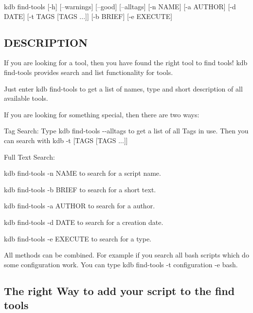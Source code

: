 {\ttfamily kdb find-\/tools} \mbox{[}-\/h\mbox{]} \mbox{[}--warnings\mbox{]} \mbox{[}--good\mbox{]} \mbox{[}--alltags\mbox{]} \mbox{[}-\/n N\+A\+ME\mbox{]} \mbox{[}-\/a A\+U\+T\+H\+OR\mbox{]} \mbox{[}-\/d D\+A\+TE\mbox{]} \mbox{[}-\/t T\+A\+GS \mbox{[}T\+A\+GS ...\mbox{]}\mbox{]} \mbox{[}-\/b B\+R\+I\+EF\mbox{]} \mbox{[}-\/e E\+X\+E\+C\+U\+TE\mbox{]}

\subsection*{D\+E\+S\+C\+R\+I\+P\+T\+I\+ON}

If you are looking for a tool, then you have found the right tool to find tools! {\ttfamily kdb find-\/tools} provides search and list functionality for tools.

Just enter {\ttfamily kdb find-\/tools} to get a list of names, type and short description of all available tools.

If you are looking for something special, then there are two ways\+:


\begin{DoxyEnumerate}
\item Tag Search\+: Type {\ttfamily kdb find-\/tools -\/-\/alltags} to get a list of all Tags in use. Then you can search with {\ttfamily kdb -\/t \mbox{[}T\+A\+GS \mbox{[}T\+A\+GS ...\mbox{]}\mbox{]}}
\item Full Text Search\+:
\begin{DoxyItemize}
\item {\ttfamily kdb find-\/tools -\/n N\+A\+ME} to search for a script name.
\item {\ttfamily kdb find-\/tools -\/b B\+R\+I\+EF} to search for a short text.
\item {\ttfamily kdb find-\/tools -\/a A\+U\+T\+H\+OR} to search for a author.
\item {\ttfamily kdb find-\/tools -\/d D\+A\+TE} to search for a creation date.
\item {\ttfamily kdb find-\/tools -\/e E\+X\+E\+C\+U\+TE} to search for a type.
\end{DoxyItemize}
\end{DoxyEnumerate}

All methods can be combined. For example if you search all bash scripts which do some configuration work. You can type {\ttfamily kdb find-\/tools -\/t configuration -\/e bash}.

\subsection*{The right Way to add your script to the find tools}

